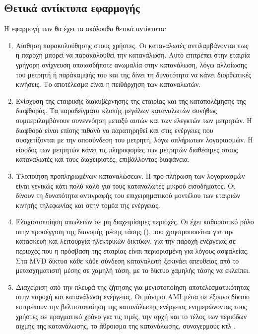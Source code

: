 \subsection{Θετικά αντίκτυπα εφαρμογής }
Η εφαρμογή των  θα έχει τα ακόλουθα θετικά αντίκτυπα:
\begin{enumerate}
\item Αίσθηση παρακολούθησης στους χρήστες. Οι καταναλωτές αντιλαμβάνονται πως η παροχή μπορεί να παρακολουθεί την κατανάλωση. Αυτό επιτρέπει στην εταιρία γρήγορη ανίχνευση οποιασδήποτε ανωμαλία στην κατανάλωση, λόγω αλλοίωσης του μετρητή ή παράκαμψής του και της δίνει τη δυνατότητα να κάνει διορθωτικές κινήσεις. Το αποτέλεσμα είναι η πειθάρχηση των καταναλωτών.
\item Ενίσχυση της εταιρικής διακυβέρνησης της εταιρίας και της καταπολέμησης της διαφθοράς. Τα παραδείγματα κλοπής μεγάλων καταναλωτών συνήθως συμπεριλαμβάνουν συνεννόηση μεταξύ αυτών και των ελεγκτών των μετρητών. Η διαφθορά είναι επίσης πιθανό να παρατηρηθεί και στις ενέργειες που συσχετίζονται με την αποσύνδεση του μετρητή, λόγω απλήρωτων λογαριασμών. Η είσοδος των μετρητών κάνει τις πληροφορίες των μετρητών διαθέσιμες στους καταναλωτές και τους διαχειριστές, επιβάλλοντας διαφάνεια.
\item Υλοποίηση προπληρωμένων καταναλώσεων. Η προ-πλήρωση των λογαριασμών είναι γενικώς κάτι πολύ καλό για τους καταναλωτές μικρού εισοδήματος. Οι  δίνουν τη δυνατότητα αντιγραφής του επιχειρηματικού μοντέλου των εταιριών κινητής τηλεφωνίας και στην τομέα της ενέργειας.
\item Ελαχιστοποίηση απωλειών σε μη διαχειρίσιμες περιοχές. Οι  έχει καθοριστικό ρόλο στην προσέγγιση της διανομής μέσης τάσης (), που χρησιμοποιείται για την κατασκευή και λειτουργία ηλεκτρικών δικτύων, για την παροχή ενέργειας σε περιοχές που η πρόσβαση της εταιρίας είναι περιορισμένη για λόγους ασφαλείας. Στα MVD δίκτυα κάθε κάθε σύνδεση καταναλωτή ξεκινάει απευθείας από το μετασχηματιστή μέσης σε χαμηλή τάση, με το δίκτυο χαμηλής τάσης να εκλείπει.
\item Διαχείριση από την πλευρά της ζήτησης για μεγιστοποίηση αποτελεσματικότητας στην παροχή και κατανάλωση ενέργειας. Οι μόνιμοι AMI μέσα σε έξυπνο δίκτυο επιτρέπουν την βελτιστοποίηση της κατανάλωσης ενέργειας ενημερώνοντας τους χρήστες σε πραγματικό χρόνο για τις τιμές, την αρχή και το τέλος των περιόδων αιχμής της κατανάλωσης, το άθροισμα της κατανάλωσης, συναγερμούς κτλ \cite{reduceloss}.
\end{enumerate}
